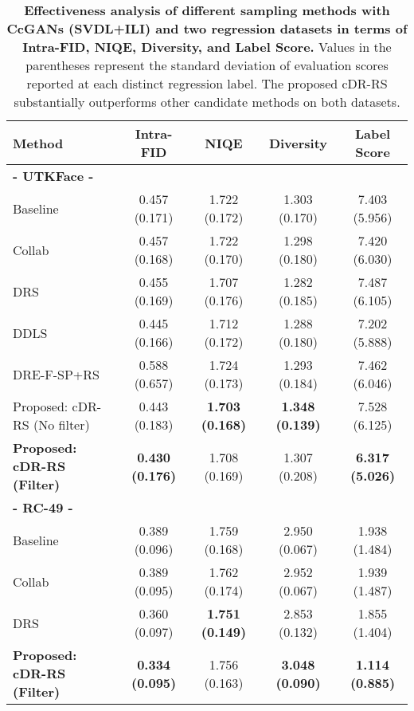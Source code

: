 \documentclass[final,12pt, 3p,times]{elsarticle}
\begin{document}
\begin{table}[htbp]
	\centering
	\caption{\textbf{Effectiveness analysis of different sampling methods with CcGANs (SVDL+ILI) and two regression datasets in terms of Intra-FID, NIQE, Diversity, and Label Score.} Values in the parentheses represent the standard deviation of evaluation scores reported at each distinct regression label. The proposed cDR-RS substantially outperforms other candidate methods on both datasets.}
\begin{adjustbox}{width=0.75\textwidth}
		\begin{tabular}{lcccc}
			\toprule
			\textbf{Method} & \textbf{Intra-FID}  & \textbf{NIQE}  & \textbf{Diversity}  & \textbf{Label Score}  \\
			\midrule
			\textbf{- UTKFace -} &  &  &  &  \\
			Baseline & 0.457 (0.171) & 1.722 (0.172) & 1.303 (0.170) & 7.403 (5.956) \\
			Collab \cite{liu2020collaborative} & 0.457 (0.168) & 1.722 (0.170) & 1.298 (0.180) & 7.420 (6.030) \\
			DRS \cite{azadi2018discriminator} & 0.455 (0.169) & 1.707 (0.176) & 1.282 (0.185) & 7.487 (6.105) \\
			DDLS \cite{che2020your} & 0.445 (0.166) & 1.712 (0.172)  & 1.288 (0.180) & 7.202 (5.888) \\
			DRE-F-SP+RS \cite{ding2020subsampling} & 0.588 (0.657) & 1.724 (0.173) & 1.293 (0.184) & 7.462 (6.046) \\
			\hdashline
			Proposed: cDR-RS (No filter) & 0.443 (0.183) & \textbf{1.703 (0.168)} & \textbf{1.348 (0.139)} & 7.528 (6.125) \\
			\textbf{Proposed: cDR-RS (Filter)} & \textbf{0.430 (0.176)} & 1.708 (0.169) & 1.307 (0.208) & \textbf{6.317 (5.026)} \\
			\midrule
			\textbf{- RC-49 -} &  &  &  &  \\
			Baseline & 0.389 (0.096) & 1.759 (0.168) & 2.950 (0.067) & 1.938 (1.484) \\
			Collab \cite{liu2020collaborative} & 0.389 (0.095) & 1.762 (0.174) & 2.952 (0.067) & 1.939 (1.487) \\
			DRS \cite{azadi2018discriminator} & 0.360 (0.097) & \textbf{1.751 (0.149)} & 2.853 (0.132) & 1.855 (1.404) \\
\hdashline
			\textbf{Proposed: cDR-RS (Filter)} & \textbf{0.334 (0.095)} & 1.756 (0.163) & \textbf{3.048 (0.090)} & \textbf{1.114 (0.885)} \\
			\bottomrule
		\end{tabular}\end{adjustbox}
	\label{tab:effectiveness_analysis_regression}\end{table}
\end{document}
